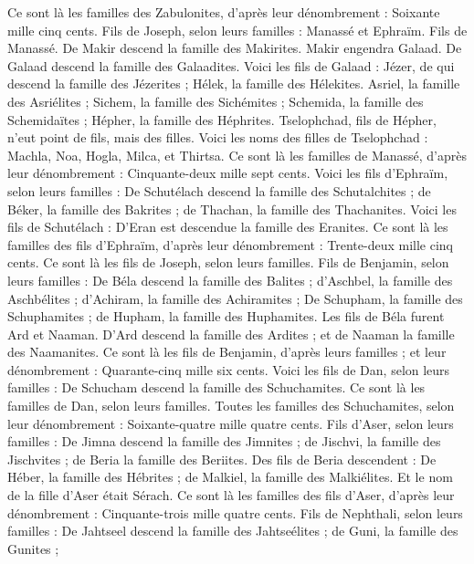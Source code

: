 \begin{multicols}{2}
Ce sont là les familles des Zabulonites, d'après leur dénombrement : Soixante mille cinq cents.
Fils de Joseph, selon leurs familles : Manassé et Ephraïm.
Fils de Manassé. De Makir descend la famille des Makirites. Makir engendra Galaad. De Galaad descend la famille des Galaadites.
Voici les fils de Galaad : Jézer, de qui descend la famille des Jézerites ; Hélek, la famille des Hélekites.
Asriel, la famille des Asriélites ; Sichem, la famille des Sichémites ;
Schemida, la famille des Schemidaïtes ; Hépher, la famille des Héphrites.
Tselophchad, fils de Hépher, n'eut point de fils, mais des filles. Voici les noms des filles de Tselophchad : Machla, Noa, Hogla, Milca, et Thirtsa.
Ce sont là les familles de Manassé, d'après leur dénombrement : Cinquante-deux mille sept cents.
Voici les fils d'Ephraïm, selon leurs familles : De Schutélach descend la famille des Schutalchites ; de Béker, la famille des Bakrites ; de Thachan, la famille des Thachanites.
Voici les fils de Schutélach : D'Eran est descendue la famille des Eranites.
Ce sont là les familles des fils d'Ephraïm, d'après leur dénombrement : Trente-deux mille cinq cents. Ce sont là les fils de Joseph, selon leurs familles.
Fils de Benjamin, selon leurs familles : De Béla descend la famille des Balites ; d'Aschbel, la famille des Aschbélites ; d'Achiram, la famille des Achiramites ;
De Schupham, la famille des Schuphamites ; de Hupham, la famille des Huphamites.
Les fils de Béla furent Ard et Naaman. D'Ard descend la famille des Ardites ; et de Naaman la famille des Naamanites.
Ce sont là les fils de Benjamin, d'après leurs familles ; et leur dénombrement : Quarante-cinq mille six cents.
Voici les fils de Dan, selon leurs familles : De Schucham descend la famille des Schuchamites. Ce sont là les familles de Dan, selon leurs familles.
Toutes les familles des Schuchamites, selon leur dénombrement : Soixante-quatre mille quatre cents.
Fils d'Aser, selon leurs familles : De Jimna descend la famille des Jimnites ; de Jischvi, la famille des Jischvites ; de Beria la famille des Beriites.
Des fils de Beria descendent : De Héber, la famille des Hébrites ; de Malkiel, la famille des Malkiélites.
Et le nom de la fille d'Aser était Sérach.
Ce sont là les familles des fils d'Aser, d'après leur dénombrement : Cinquante-trois mille quatre cents.
Fils de Nephthali, selon leurs familles : De Jahtseel descend la famille des Jahtseélites ; de Guni, la famille des Gunites ;

\end{multicols}
